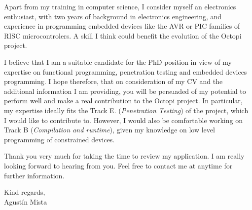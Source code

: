 \documentclass[helvetica,notitle,flagCMYK,totpages,11pt]{europecv}
\begin{document}
Apart from my training in computer science, I consider myself an electronics
enthusiast, with two years of background in electronics engineering, and
experience in programming embedded devices like the AVR or PIC families of RISC
microcontrolers.
%
A skill I think could benefit the evolution of the Octopi project.


I believe that I am a suitable candidate for the PhD position in view of my
expertise on functional programming, penetration testing and embedded devices
programming.
%
I hope therefore, that on consideration of my CV and the additional information
I am providing, you will be persuaded of my potential to perform well and make a
real contribution to the Octopi project.
%
In particular, my expertise ideally fits the Track E. (\emph{{Penetration
    Testing}}) of the project, which I would like to contribute to.
%
However, I would also be comfortable working on Track B (\emph{Compilation and
  runtime}), given my knowledge on low level programming of constrained devices.


Thank you very much for taking the time to review my application. I am really
looking forward to hearing from you. Feel free to contact me at anytime for
further information.


\vfill
Kind regards,\\
Agustín Mista
\end{document}
